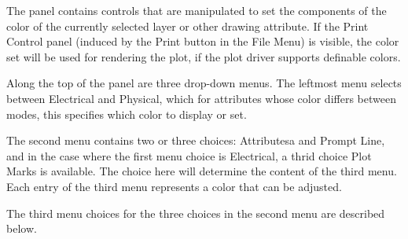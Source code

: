The panel contains controls that are manipulated to set the components
of the color of the currently selected layer or other drawing
attribute.  If the {\cb Print Control} panel (induced by the {\cb
Print} button in the {\cb File Menu}) is visible, the color set will
be used for rendering the plot, if the plot driver supports definable
colors.

Along the top of the panel are three drop-down menus.  The leftmost
menu selects between {\cb Electrical} and {\cb Physical}, which for
attributes whose color differs between modes, this specifies which
color to display or set.

The second menu contains two or three choices:  {\cb Attributesa} and
{\cb Prompt Line}, and in the case where the first menu choice is {\cb
Electrical}, a thrid choice {\cb Plot Marks} is available.  The choice
here will determine the content of the third menu.  Each entry of the
third menu represents a color that can be adjusted.

The third menu choices for the three choices in the second menu
are described below.

